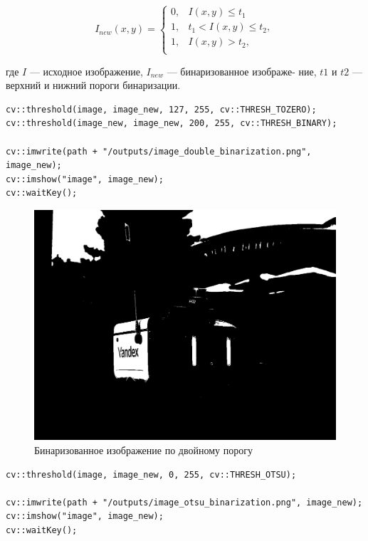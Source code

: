 \begin{equation}
    I_{new}(x, y) = \begin{cases}
        0, & I(x, y) \leq t_1 \\[1pt]
        1, & t_1 < I(x, y) \leq t_2,\\[1pt]
        1, & I(x, y) > t_2,\\[1pt]
    \end{cases} 
\label{eq:complex_func}
\end{equation}

где $I$ — исходное изображение, $I_{new}$ — бинаризованное изображе-
ние, $t1$ и $t2$ — верхний и нижний пороги бинаризации.

\begin{lstlisting}[style=cpp_white, caption={Исходный код для бинаризации по двойному порогу}]
cv::threshold(image, image_new, 127, 255, cv::THRESH_TOZERO);
cv::threshold(image_new, image_new, 200, 255, cv::THRESH_BINARY);

cv::imwrite(path + "/outputs/image_double_binarization.png", image_new);
cv::imshow("image", image_new);
cv::waitKey();
\end{lstlisting}

\begin{figure}[ht]
    \includegraphics[width=\textwidth]{../outputs/image_double_binarization.png}
    \caption{Бинаризованное изображение по двойному порогу}
    \label{fig:р}
\end{figure}

\begin{lstlisting}[style=cpp_white, caption={Исходный код для бинаризации по двойному порогу, вычисленному статистическим методом Отсу}]
cv::threshold(image, image_new, 0, 255, cv::THRESH_OTSU);

cv::imwrite(path + "/outputs/image_otsu_binarization.png", image_new);
cv::imshow("image", image_new);
cv::waitKey();
\end{lstlisting}

